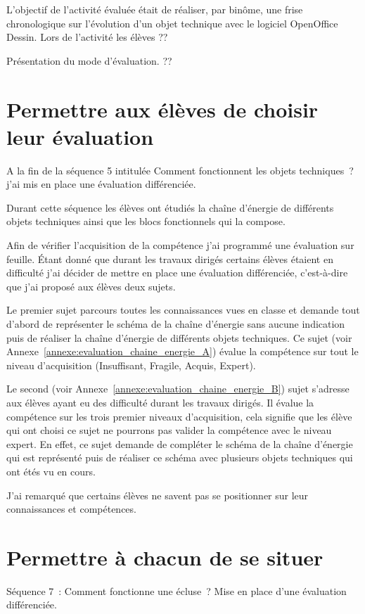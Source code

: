 L'objectif de l'activité évaluée était de réaliser, par binôme, une frise chronologique sur l'évolution d'un objet technique avec le logiciel OpenOffice Dessin.
Lors de l'activité les élèves  ??

Présentation du mode d'évaluation. ??

\section{Permettre aux élèves de choisir leur évaluation}

A la fin de la séquence 5 intitulée \og Comment fonctionnent les objets techniques~?\fg j'ai mis en place une évaluation différenciée.

Durant cette séquence les élèves ont étudiés la chaîne d'énergie de différents objets techniques ainsi que les blocs fonctionnels qui la compose.

Afin de vérifier l'acquisition de la compétence j'ai programmé une évaluation sur feuille.
Étant donné que durant les travaux dirigés certains élèves étaient en difficulté j'ai décider de mettre en place une évaluation différenciée, c'est-à-dire que j'ai proposé aux élèves deux sujets.

Le premier sujet parcours toutes les connaissances vues en classe et demande tout d'abord de représenter le schéma de la chaîne d'énergie sans aucune indication puis de réaliser la chaîne d'énergie de différents objets techniques.
Ce sujet (voir Annexe~\ref{annexe:evaluation_chaine_energie_A}) évalue la compétence sur tout le niveau d'acquisition (Insuffisant, Fragile, Acquis, Expert).

Le second (voir Annexe~\ref{annexe:evaluation_chaine_energie_B}) sujet s'adresse aux élèves ayant eu des difficulté durant les travaux dirigés.
Il évalue la compétence sur les trois premier niveaux d'acquisition, cela signifie que les élève qui ont choisi ce sujet ne pourrons pas valider la compétence avec le niveau expert.
En effet, ce sujet demande de compléter le schéma de la chaîne d'énergie qui est représenté puis de réaliser ce schéma avec plusieurs objets techniques qui ont étés vu en cours.



J'ai remarqué que certains élèves ne savent pas se positionner sur leur connaissances et compétences.





\section{Permettre à chacun de se situer }

Séquence 7~: Comment fonctionne une écluse~?
Mise en place d'une évaluation différenciée.



